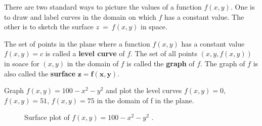 \documentclass[12pt,a4paper,draft]{article}
\newenvironment{definition}{\begin{definitionbox}}{\end{definitionbox}\vspace{1\baselineskip}}
\begin{document}
There are two standard ways to picture the values of a function \(f(x,y)\). One is to draw and label curves in the domain on which \(f\) has a constant value. The other is to sketch the surface \(z\ =\ f(x,y)\) in space.

\begin{definition}
    The set of points in the plane where a function \(f(x,y)\) has a constant value \(f(x,y) = c\) is called a \textbf{level curve} of \(f\).
    The set of all points \((x, y, f(x,y))\) in soace for \((x,y)\) in the domain of \(f\) is called the \textbf{graph} of \(f\).
    The graph of \(f\) is also called the \textbf{surface} \(\mathbf{z = f(x,y)}\).
\end{definition}

\newpage

\begin{example}
    Graph \(f(x,y) = 100 - x^2 - y^2\) and plot the level curves \(f(x,y) = 0\), \(f(x,y) = 51\), \(f(x,y) = 75\) in the domain of f in the plane.
    \begin{figure}[h]
        \centering

        \caption{Surface plot of $f(x,y) = 100 - x^2 - y^2$ .}
        \label{fig:surfaceplot}
    \end{figure}

\end{example}
\end{document}
